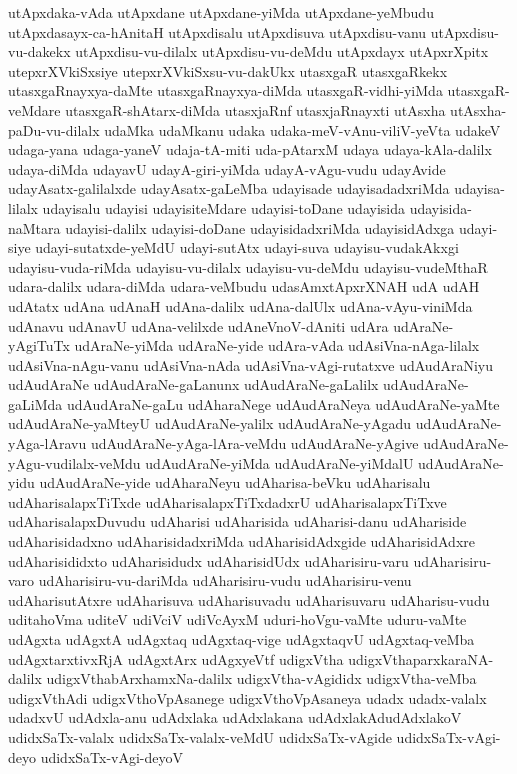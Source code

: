 {utApxdaka-vAda
utApxdane
utApxdane-yiMda
utApxdane-yeMbudu
utApxdasayx-ca-hAnitaH
utApxdisalu
utApxdisuva
utApxdisu-vanu
utApxdisu-vu-dakekx
utApxdisu-vu-dilalx
utApxdisu-vu-deMdu
utApxdayx
utApxrXpitx
utepxrXVkiSxsiye
utepxrXVkiSxsu-vu-dakUkx
utasxgaR
utasxgaRkekx
utasxgaRnayxya-daMte
utasxgaRnayxya-diMda
utasxgaR-vidhi-yiMda
utasxgaR-veMdare
utasxgaR-shAtarx-diMda
utasxjaRnf
utasxjaRnayxti
utAsxha
utAsxha-paDu-vu-dilalx
udaMka
udaMkanu
udaka
udaka-meV-vAnu-viliV-yeVta
udakeV
udaga-yana
udaga-yaneV
udaja-tA-miti
uda-pAtarxM
udaya
udaya-kAla-dalilx
udaya-diMda
udayavU
udayA-giri-yiMda
udayA-vAgu-vudu
udayAvide
udayAsatx-galilalxde
udayAsatx-gaLeMba
udayisade
udayisadadxriMda
udayisa-lilalx
udayisalu
udayisi
udayisiteMdare
udayisi-toDane
udayisida
udayisida-naMtara
udayisi-dalilx
udayisi-doDane
udayisidadxriMda
udayisidAdxga
udayi-siye
udayi-sutatxde-yeMdU
udayi-sutAtx
udayi-suva
udayisu-vudakAkxgi
udayisu-vuda-riMda
udayisu-vu-dilalx
udayisu-vu-deMdu
udayisu-vudeMthaR
udara-dalilx
udara-diMda
udara-veMbudu
udasAmxtApxrXNAH
udA
udAH
udAtatx
udAna
udAnaH
udAna-dalilx
udAna-dalUlx
udAna-vAyu-viniMda
udAnavu
udAnavU
udAna-velilxde
udAneVnoV-dAniti
udAra
udAraNe-yAgiTuTx
udAraNe-yiMda
udAraNe-yide
udAra-vAda
udAsiVna-nAga-lilalx
udAsiVna-nAgu-vanu
udAsiVna-nAda
udAsiVna-vAgi-rutatxve
udAudAraNiyu
udAudAraNe
udAudAraNe-gaLanunx
udAudAraNe-gaLalilx
udAudAraNe-gaLiMda
udAudAraNe-gaLu
udAharaNege
udAudAraNeya
udAudAraNe-yaMte
udAudAraNe-yaMteyU
udAudAraNe-yalilx
udAudAraNe-yAgadu
udAudAraNe-yAga-lAravu
udAudAraNe-yAga-lAra-veMdu
udAudAraNe-yAgive
udAudAraNe-yAgu-vudilalx-veMdu
udAudAraNe-yiMda
udAudAraNe-yiMdalU
udAudAraNe-yidu
udAudAraNe-yide
udAharaNeyu
udAharisa-beVku
udAharisalu
udAharisalapxTiTxde
udAharisalapxTiTxdadxrU
udAharisalapxTiTxve
udAharisalapxDuvudu
udAharisi
udAharisida
udAharisi-danu
udAhariside
udAharisidadxno
udAharisidadxriMda
udAharisidAdxgide
udAharisidAdxre
udAharisididxto
udAharisidudx
udAharisidUdx
udAharisiru-varu
udAharisiru-varo
udAharisiru-vu-dariMda
udAharisiru-vudu
udAharisiru-venu
udAharisutAtxre
udAharisuva
udAharisuvadu
udAharisuvaru
udAharisu-vudu
uditahoVma
uditeV
udiVciV
udiVcAyxM
uduri-hoVgu-vaMte
uduru-vaMte
udAgxta
udAgxtA
udAgxtaq
udAgxtaq-vige
udAgxtaqvU
udAgxtaq-veMba
udAgxtarxtivxRjA
udAgxtArx
udAgxyeVtf
udigxVtha
udigxVthaparxkaraNA-dalilx
udigxVthabArxhamxNa-dalilx
udigxVtha-vAgididx
udigxVtha-veMba
udigxVthAdi
udigxVthoVpAsanege
udigxVthoVpAsaneya
udadx
udadx-valalx
udadxvU
udAdxla-anu
udAdxlaka
udAdxlakana
udAdxlakAdudAdxlakoV
udidxSaTx-valalx
udidxSaTx-valalx-veMdU
udidxSaTx-vAgide
udidxSaTx-vAgi-deyo
udidxSaTx-vAgi-deyoV
}

